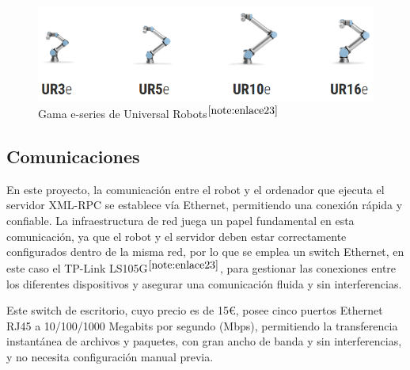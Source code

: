 \begin{figure} [H]
    \begin{center}
      \includegraphics[width=15cm]{figs/Gama e-series.png}
    \end{center}
    \caption{Gama e-series de Universal Robots$^{\ref{note:enlace23}}$}
    \label{fig:Gama_e-series}
\end{figure}

\setcounter{footnote}{22} 


\subsection{Comunicaciones}
\label{subsec:comunicacion}

En este proyecto, la comunicación entre el robot y el ordenador que ejecuta el servidor XML-RPC se establece vía Ethernet, permitiendo una conexión rápida y confiable. La infraestructura de red juega un papel fundamental en esta comunicación, ya que el robot y el servidor deben estar correctamente configurados dentro de la misma red, por lo que se emplea un switch Ethernet, en este caso el TP-Link LS105G$^{\ref{note:enlace23}}$, %
para gestionar las conexiones entre los diferentes dispositivos y asegurar una comunicación fluida y sin interferencias.

Este switch de escritorio, cuyo precio es de 15€,  posee cinco puertos Ethernet RJ45 a 10/100/1000 Megabits por segundo (Mbps), permitiendo la transferencia instantánea de archivos y paquetes, con gran ancho de banda y sin interferencias, y no necesita configuración manual previa.%


